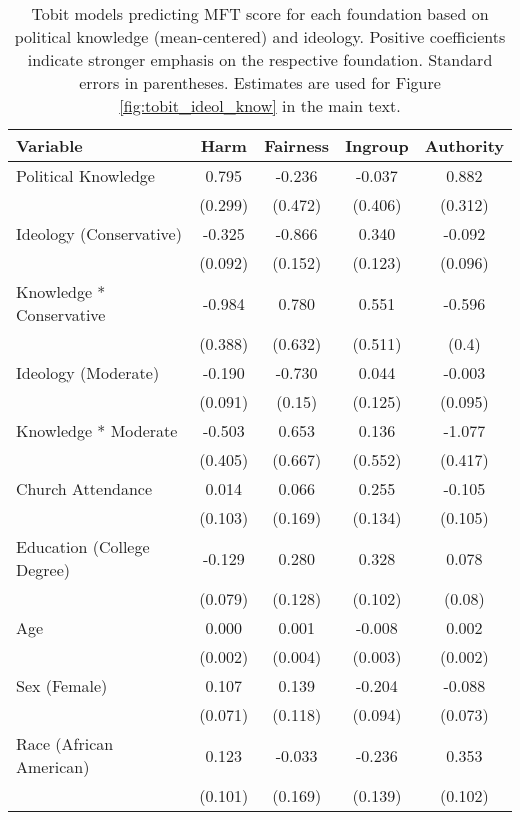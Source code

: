 \begin{table}[ht]
\centering
\caption{Tobit models predicting MFT score for each foundation based 
           on political knowledge (mean-centered) and ideology. Positive coefficients indicate stronger 
           emphasis on the respective foundation. Standard errors in parentheses. Estimates are used 
           for Figure \ref{fig:tobit_ideol_know} in the main text.} 
\label{tab:tobit_ideol_know}
\begingroup\footnotesize
\begin{tabular}{lcccc}
  \hline
Variable & Harm & Fairness & Ingroup & Authority \\ 
  \hline
Political Knowledge &  0.795 & -0.236 & -0.037 &  0.882 \\ 
   & (0.299) & (0.472) & (0.406) & (0.312) \\ 
  Ideology (Conservative) & -0.325 & -0.866 &  0.340 & -0.092 \\ 
   & (0.092) & (0.152) & (0.123) & (0.096) \\ 
  Knowledge * Conservative & -0.984 &  0.780 &  0.551 & -0.596 \\ 
   & (0.388) & (0.632) & (0.511) & (0.4) \\ 
  Ideology (Moderate) & -0.190 & -0.730 &  0.044 & -0.003 \\ 
   & (0.091) & (0.15) & (0.125) & (0.095) \\ 
  Knowledge * Moderate & -0.503 &  0.653 &  0.136 & -1.077 \\ 
   & (0.405) & (0.667) & (0.552) & (0.417) \\ 
  Church Attendance &  0.014 &  0.066 &  0.255 & -0.105 \\ 
   & (0.103) & (0.169) & (0.134) & (0.105) \\ 
  Education (College Degree) & -0.129 &  0.280 &  0.328 &  0.078 \\ 
   & (0.079) & (0.128) & (0.102) & (0.08) \\ 
  Age &  0.000 &  0.001 & -0.008 &  0.002 \\ 
   & (0.002) & (0.004) & (0.003) & (0.002) \\ 
  Sex (Female) &  0.107 &  0.139 & -0.204 & -0.088 \\ 
   & (0.071) & (0.118) & (0.094) & (0.073) \\ 
  Race (African American) &  0.123 & -0.033 & -0.236 &  0.353 \\ 
   & (0.101) & (0.169) & (0.139) & (0.102) \\ 

\end{tabular}
\end{table}
